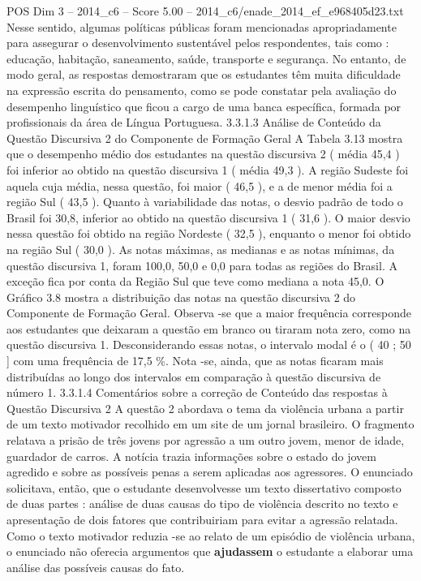 \begin{textsample}{POS Dim 3 – 2014\_c6 – Score 5.00 – 2014\_c6/enade\_2014\_ef\_e968405d23.txt}
Nesse sentido, algumas políticas públicas foram mencionadas apropriadamente para assegurar o desenvolvimento sustentável pelos respondentes, tais como : educação, habitação, saneamento, saúde, transporte e segurança.
No entanto, de modo geral, as respostas demostraram que os estudantes têm muita dificuldade na expressão escrita do pensamento, como se pode constatar pela avaliação do desempenho linguístico que ficou a cargo de uma banca específica, formada por profissionais da área de Língua Portuguesa. 3.3.1.3 Análise de Conteúdo da Questão Discursiva 2 do Componente de Formação Geral A Tabela 3.13 mostra que o desempenho médio dos estudantes na questão discursiva 2 ( média 45,4 ) foi inferior ao obtido na questão discursiva 1 ( média 49,3 ).
A região Sudeste foi aquela cuja média, nessa questão, foi maior ( 46,5 ), e a de menor média foi a região Sul ( 43,5 ).
Quanto à variabilidade das notas, o desvio padrão de todo o Brasil foi 30,8, inferior ao obtido na questão discursiva 1 ( 31,6 ).
O maior desvio nessa questão foi obtido na região Nordeste ( 32,5 ), enquanto o menor foi obtido na região Sul ( 30,0 ).
As notas máximas, as medianas e as notas mínimas, da questão discursiva 1, foram 100,0, 50,0 e 0,0 para todas as regiões do Brasil.
A exceção fica por conta da Região Sul que teve como mediana a nota 45,0.
O Gráfico 3.8 mostra a distribuição das notas na questão discursiva 2 do Componente de Formação Geral.
Observa -se que a maior frequência corresponde aos estudantes que deixaram a questão em branco ou tiraram nota zero, como na questão discursiva 1.
Desconsiderando essas notas, o intervalo modal é o ( 40 ; 50 ] com uma frequência de 17,5 \%.
Nota -se, ainda, que as notas ficaram mais distribuídas ao longo dos intervalos em comparação à questão discursiva de número 1. 3.3.1.4 Comentários sobre a correção de Conteúdo das respostas à Questão Discursiva 2 A questão 2 abordava o tema da violência urbana a partir de um texto motivador recolhido em um site de um jornal brasileiro.
O fragmento relatava a prisão de três jovens por agressão a um outro jovem, menor de idade, guardador de carros.
A notícia trazia informações sobre o estado do jovem agredido e sobre as possíveis penas a serem aplicadas aos agressores.
O enunciado solicitava, então, que o estudante desenvolvesse um texto dissertativo composto de duas partes : análise de duas causas do tipo de violência descrito no texto e apresentação de dois fatores que contribuiriam para evitar a agressão relatada.
Como o texto motivador reduzia -se ao relato de um episódio de violência urbana, o enunciado não oferecia argumentos que \textbf{ajudassem} o estudante a elaborar uma análise das possíveis causas do fato.

\end{textsample}
